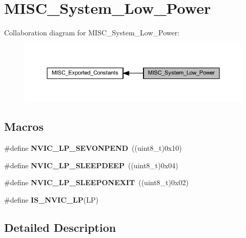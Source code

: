 \hypertarget{group___m_i_s_c___system___low___power}{}\section{M\+I\+S\+C\+\_\+\+System\+\_\+\+Low\+\_\+\+Power}
\label{group___m_i_s_c___system___low___power}
Collaboration diagram for M\+I\+S\+C\+\_\+\+System\+\_\+\+Low\+\_\+\+Power\+:\nopagebreak
\begin{figure}[H]
\begin{center}
\leavevmode
\includegraphics[width=350pt]{group___m_i_s_c___system___low___power}
\end{center}
\end{figure}
\subsection*{Macros}
\begin{DoxyCompactItemize}
\item 
\mbox{\label{group___m_i_s_c___system___low___power_ga10748d2b2875afd122f6476864ad6cae}} 
\#define {\bfseries N\+V\+I\+C\+\_\+\+L\+P\+\_\+\+S\+E\+V\+O\+N\+P\+E\+ND}~((uint8\+\_\+t)0x10)
\item 
\mbox{\label{group___m_i_s_c___system___low___power_gaeec2d10922fa9ec5e65398667b303253}} 
\#define {\bfseries N\+V\+I\+C\+\_\+\+L\+P\+\_\+\+S\+L\+E\+E\+P\+D\+E\+EP}~((uint8\+\_\+t)0x04)
\item 
\mbox{\label{group___m_i_s_c___system___low___power_ga368dc13a9c762a307c07cfa2e3ef59ad}} 
\#define {\bfseries N\+V\+I\+C\+\_\+\+L\+P\+\_\+\+S\+L\+E\+E\+P\+O\+N\+E\+X\+IT}~((uint8\+\_\+t)0x02)
\item 
\#define {\bfseries I\+S\+\_\+\+N\+V\+I\+C\+\_\+\+LP}(LP)
\end{DoxyCompactItemize}


\subsection{Detailed Description}


